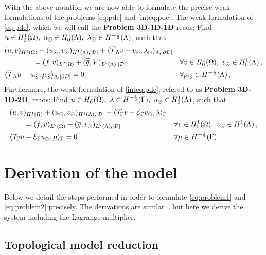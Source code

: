 \documentclass[r]{siamart171218}
\begin{document}
With the above notation we are now able to formulate the precise weak formulations of the problems 
\eqref{eq:pde} and \eqref{inteq:pde}. 
The weak formulation of \eqref{eq:pde}, which we will call the \textbf{Problem 3D-1D-1D} reads: 
Find $u \in H^1_0(\Omega),\ u_{\odot} \in H^1_0(\Lambda), \ \lambda_{\odot} \in H^{-\frac 1 2}(\Lambda)$, such that
\begin{subequations}\label{eq:problem2}
\begin{align}
&(u,v)_{H^1(\Omega)} + (u_{\odot},v_{\odot})_{H^1(\Lambda),|\mathcal{D}|} 
+  \langle {\overline{\mathcal{T}}_\Lambda} v - v_{\odot}, \lambda_{\odot} \rangle_{\Lambda, |\partial\mathcal{D}|} &&
\\
\nonumber
&\qquad\qquad= (f,v)_{L^2(\Omega)} +  (\overline{\overline{g}},V)_{L^2(\Lambda),|\mathcal{D}|}
\quad && \forall v \in H^1_0(\Omega), \ v_{\odot} \in H^1_0(\Lambda)\,,
\\
& \langle {\overline{\mathcal{T}}_\Lambda} u -   u_{\odot}, \mu_{\odot} \rangle_{\Lambda,|\partial\mathcal{D}|} = 0
\quad &&\forall \mu_{\odot} \in H^{-\frac 1 2}(\Lambda)\,,
\end{align}
\end{subequations}
Furthermore, the weak formulation of \eqref{inteq:pde}, refered to as \textbf{Problem 3D-1D-2D}, reads: 
Find $u \in H^1_0(\Omega), \ \lambda \in H^{-\frac 1 2}(\Gamma ),\ u_{\odot} \in H^1_0(\Lambda)$, such that
\begin{subequations}\label{eq:problem1}
\begin{align}
&(u,v)_{H^1(\Omega)} + (u_{\odot},v_{\odot})_{H^1(\Lambda),|\mathcal{D}|} 
+ \langle {\mathcal{T}_\Gamma} v  - \mathcal{E}_\Gamma v_{\odot}, \lambda \rangle_\Gamma &&
\\
\nonumber
&\qquad= (f,v)_{L^2(\Omega)} +  (\overline{\overline{g}},v_{\odot})_{L^2(\Lambda),|\mathcal{D}|}
\quad &&\forall v \in H^1_0(\Omega), \ v_{\odot} \in H^1(\Lambda)\,,
\\
& \langle {\mathcal{T}_\Gamma} u - \mathcal{E}_\Gamma u_{\odot} , \mu \rangle_\Gamma = 0
\quad && \forall \mu \in H^{-\frac 1 2}(\Gamma)\,.
\end{align}
\end{subequations}


\section{Derivation of the model}
Below we detail the steps performed in order to formulate \ref{eq:problem1} and \ref{eq:problem2} precisely. 
The derivations are similar~\cite{laurino_m2an},  but here we derive the system including the Lagrange multiplier. 

\subsection{Topological model reduction}
\end{document}
